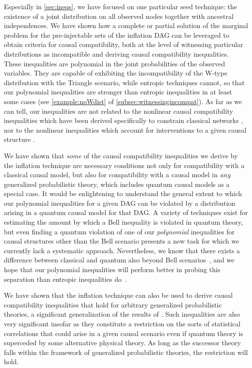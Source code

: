 \documentclass[aps,english,superscriptaddress,onecolumn,twoside,longbibliography,pra,floatfix,fleqn,nofootinbib]{revtex4-1}%
\theoremstyle{definition}
\newcounter{example}[section]
\begin{document}
Especially in \cref{sec:ineqs}, we have focused on one particular seed technique: the existence of a joint distribution on all observed nodes together with ancestral independences. We have shown how a complete or partial solution of the marginal problem for the pre-injectable sets of the inflation DAG can be leveraged to obtain criteria for causal compatibility, both at the level of witnessing particular distributions as incompatible and deriving causal compatibility inequalities. These inequalities are polynomial in the joint probabilities of the observed variables. They are capable of exhibiting the incompatibility of the W-type distribution with the Triangle scenario, while entropic techniques cannot, so that our polynomial inequalities are stronger than entropic inequalities in at least some cases (see \cref{example:noWdist} of \cref{subsec:witnessingincompat}). As far as we can tell, our inequalities are not related to the nonlinear causal compatibility inequalities which have been derived specifically to constrain classical networks \cite{TavakoliStarNetworks,RossetNetworks,TavakoliNoncyclicNetworks}, nor to the nonlinear inequalities which account for interventions to a given causal structure \cite{kang2007polynomialconstraints,steeg2011relaxation}.

We have shown that \emph{some} of the causal compatibility inequalities we derive by the inflation technique are necessary conditions not only for compatibility with a classical causal model, but also for compatibility with a causal model in {\em any} generalized probabilistic theory, which includes quantum causal models as a special case. It would be enlightening to understand the general extent to which our polynomial inequalities for a given DAG can be violated by a distribution arising in a quantum causal model for that DAG. A variety of techniques exist for estimating the amount by which a Bell inequality \cite{NPA2008Long,I3322NPA1} is violated in quantum theory, but even finding a quantum violation of one of our \emph{polynomial} inequalities for causal structures other than the Bell scenario presents a new task for which we currently lack a systematic approach. Nevertheless, we know that there exists a difference between classical and quantum also beyond Bell scenarios~\cite[Theorem~2.16]{fritz2012bell}, and we hope that our polynomial inequalities will perform better in probing this separation than entropic inequalities do~\cite{pusey2014gdag,Chaves2015infoquantum}. 

We have shown that the inflation technique can also be used to derive causal compatibility inequalities that hold for arbitrary generalized probabilistic theories, a significant generalization of the results of \cite{pusey2014gdag}.  Such inequalities are also very significant insofar as they constitute a restriction on the sorts of statistical correlations that could arise in a given causal scenario even if quantum theory is superceded by some alternative physical theory.  As long as the successor theory falls within the framework of generalized probabilistic theories, the restriction will hold. 
\end{document}
